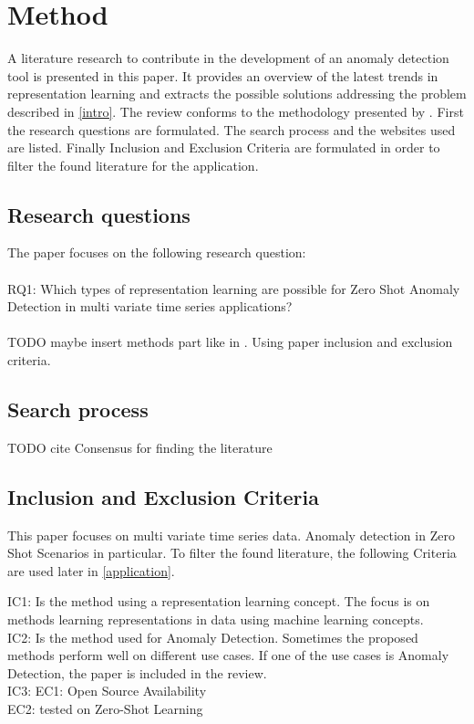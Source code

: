 \section{Method}\label{method}
A literature research to contribute in the development of an anomaly detection tool is presented in this paper. It provides an overview of the latest trends in representation learning and extracts the possible solutions addressing the problem described in \ref{intro}. The review conforms to the methodology presented by . First the research questions are formulated. The search process and the websites used are listed. Finally Inclusion and Exclusion Criteria are formulated in order to filter the found literature for the application.
\subsection{Research questions}
The paper focuses on the following research question:\\\\
RQ1: Which types of representation learning are possible for Zero Shot Anomaly Detection in multi variate time series applications?\\\\
TODO maybe insert methods part like in \cite{su_large_2024}. Using paper inclusion and exclusion criteria.
\subsection{Search process}
TODO cite Consensus for finding the literature
\subsection{Inclusion and Exclusion Criteria}
This paper focuses on multi variate time series data. Anomaly detection in Zero Shot Scenarios in particular. To filter the found literature, the following Criteria are used later in \ref{application}. 


\label{tab_criteria}
\begin{list}
\item IC1: Is the method using a representation learning concept. The focus is on methods learning representations in data using machine learning concepts.\\
IC2: Is the method used for Anomaly Detection. Sometimes the proposed methods perform well on different use cases. If one of the use cases is Anomaly Detection, the paper is included in the review.\\
IC3:  
EC1: Open Source Availability \\
EC2: tested on Zero-Shot Learning
\end{list}
